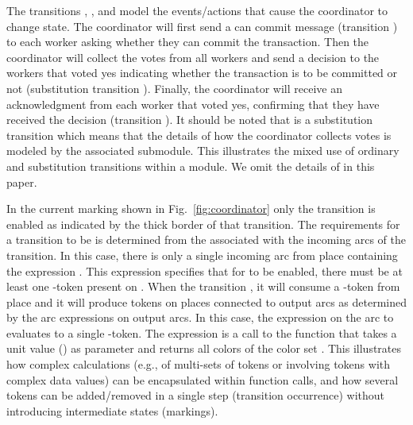 The transitions , , and
 model the
events/actions that cause the coordinator to change state. The
coordinator will first send a can commit message (transition
) to each worker asking whether they can commit
the transaction. Then the coordinator will collect the votes from all
workers and send a decision to the workers that voted yes indicating
whether the transaction is to be committed or not (substitution
transition ). Finally, the coordinator will
receive an acknowledgment from each worker that voted yes, confirming
that they have received the decision (transition
).  It should be noted that
 is a substitution transition which means that
the details of how the coordinator collects votes is modeled by the
associated  submodule. This illustrates the
mixed use of ordinary and substitution transitions within a module. We
omit the details of  in this paper.


In the current marking shown in Fig.~\ref{fig:coordinator} only the
transition  is enabled as indicated by the
thick border of that transition. The requirements for a transition to
be  is determined from the 
associated with the incoming arcs of the transition. In this case,
there is only a single incoming arc from place 
containing the expression \smlcode{()}. This expression specifies that
for  to be enabled, there must be at least one
\smlcode{()}-token present on . When the
 transition , it will consume a
\smlcode{()}-token from place  and it will produce
tokens on places connected to output arcs as determined by
 the arc expressions on output arcs. In this case,
the expression \smlcode{()} on the arc to 
evaluates to a single \smlcode{()}-token. The expression
 is a call to the function 
that takes a unit value (\smlcode{()}) as parameter and returns all
colors of the color set . This illustrates how complex
calculations (e.g., of multi-sets of tokens or involving tokens with
complex data values) can be encapsulated within function calls, and
how several tokens can be added/removed in a single step (transition
occurrence) without introducing intermediate states (markings).

